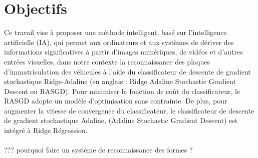 	\section{Objectifs}
		Ce travail vise à proposer une méthode intelligent, basé sur l'intelligence artificielle (IA), qui permet aux ordinateurs et aux systèmes de dériver des informations significatives à partir d'images numériques, de vidéos et d'autres entrées visuelles, dans notre contexte la reconnaissance des plaques d’immatriculation des véhicules à l'aide du classificateur de descente de gradient stochastique Ridge-Adaline (en anglais : Ridge Adaline Stochastic Gradient Descent ou RASGD).
		Pour minimiser la fonction de coût du classificateur, le RASGD adopte un modèle d'optimisation sans contrainte. De plus, pour augmenter la vitesse de convergence du classificateur, le classificateur de descente de gradient stochastique Adaline, (Adaline Stochastic Gradient Descent) est intégré à Ridge Régression.\cite{deepa2021ai}\\ \\
		??? pourquoi faire un système de reconnaissance des formes ?
		
		
		
		